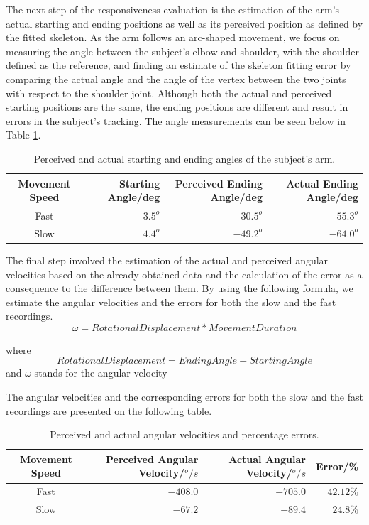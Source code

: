 \documentclass[10pt]{article}
\begin{document}
The next step of the responsiveness evaluation is the estimation of the arm's actual starting and ending positions as well as its perceived position as defined by the fitted skeleton. As the arm follows an arc-shaped movement, we focus on measuring the angle between the subject's elbow and shoulder, with the shoulder  defined as the reference, and finding an estimate of the skeleton fitting error by comparing the actual angle and the angle of the vertex between the two joints with respect to the shoulder joint. Although both the actual and perceived starting positions are the same, the ending positions are different and result in errors in the subject's tracking. The angle measurements can be seen below in Table \ref{angle}.

\begin{table}[H]
\center
\begin{tabular}{| c | r | r | r |}
\hline
Movement Speed & Starting Angle/deg & Perceived Ending Angle/deg & Actual Ending Angle/deg\\
\hline
Fast & $3.5^o$ & $-30.5^o$ & $-55.3^o$\\
Slow & $4.4^o$ & $-49.2^o$ & $-64.0^o$\\
\hline
\end{tabular}
\caption{Perceived and actual starting and ending angles of the subject's arm.}
\label{angle}
\end{table}

The final step involved the estimation of the actual and perceived angular velocities based on the already obtained data and the calculation of the error as a consequence to the difference between them. By using the following formula, we estimate the angular velocities and the errors for both the slow and the fast recordings.
\begin{equation}
\omega = RotationalDisplacement * MovementDuration
\end{equation}

\noindent where \[RotationalDisplacement = EndingAngle - StartingAngle\]
and  $\omega$ stands for the angular velocity

\noindent The angular velocities and the corresponding errors for both the slow and the fast recordings are presented on the following table.

\begin{table}[H]
\center
\begin{tabular}{| c | r | r | r |}
\hline
Movement Speed & Perceived Angular Velocity/$^o/s$ & Actual Angular Velocity/$^o/s$ & Error/\% \\
\hline
Fast & $-408.0$ & $-705.0$ & $42.12\%$ \\
Slow & $-67.2$ & $-89.4$ & $24.8\%$ \\
\hline
\end{tabular}
\caption{Perceived and actual angular velocities and percentage errors.}
\end{table}
\end{document}
